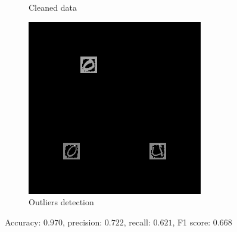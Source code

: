 \documentclass{beamer}
\theoremstyle{plain}
\theoremstyle{definition}
\theoremstyle{remark}
\begin{document}
\begin{frame}
\begin{figure}
\begin{subfigure}[b]{0.3\textwidth}
			\caption{Cleaned data}
		\end{subfigure}
		\hfill
		\begin{subfigure}[b]{0.3\textwidth}
			\centering
			\includegraphics[width=\textwidth]{Images/l21S_5.468.png}
			\caption{Outliers detection}
		\end{subfigure}
		   \caption{Accuracy: $0.970$, precision: $0.722$, recall: $0.621$, F1 score: $0.668$}
   \end{figure}
\end{frame}
\end{document}
